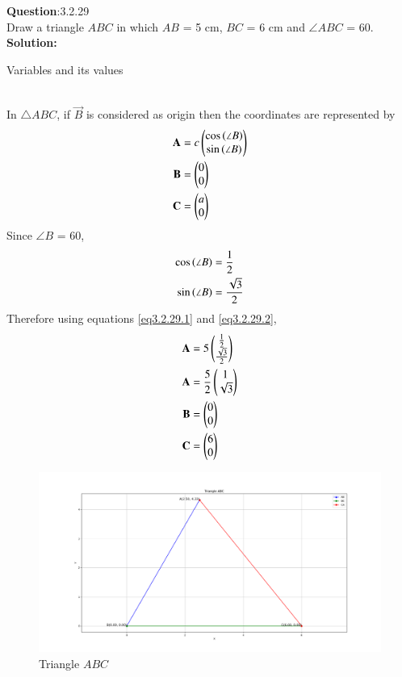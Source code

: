 \documentclass[journal]{IEEEtran}
\begin{document}
\textbf{Question}:3.2.29\\
Draw a triangle $ABC$ in which $AB$ = 5 cm, $BC$ = 6 cm and $\angle ABC$ = 60\degree.
\\
\textbf{Solution:}
\renewcommand{\tablename}{Table 3.2.29.1}
\begin{table}[h!]
  \centering
  
  \caption{Variables and its values}
\end{table}
\\
In $\triangle ABC$, if $\vec{B}$ is considered as origin then the coordinates are represented by
 \begin{align}
 \mathbf{A} & = c\begin{pmatrix}\cos{\ensuremath{\left(\angle B\right)}} \\ \sin{\ensuremath{\left(\angle B\right)}}\end{pmatrix} \label{eq3.2.29.1} \\
 \mathbf{B} & = \begin{pmatrix}0 \\ 0\end{pmatrix} \\
 \mathbf{C} & = \begin{pmatrix}a \\ 0\end{pmatrix} \label{eq3.2.29.2}
 \end{align}
 Since $\angle B$ = 60\degree,
 \begin{align}
     \cos{\ensuremath{\left(\angle B\right)}} & = \frac{1}{2} \\
    \sin{\ensuremath{\left(\angle B\right)}} & = \frac{\sqrt{3}}{2}
 \end{align}
Therefore using equations \ref{eq3.2.29.1} and \ref{eq3.2.29.2},
\begin{align}
\mathbf{A} & = 5\begin{pmatrix}\frac{1}{2} \\ \frac{\sqrt{3}}{2}\end{pmatrix} \\
\mathbf{A} & = \frac{5}{2}\begin{pmatrix}1 \\ \sqrt{3}\end{pmatrix} \\
\mathbf{B} & = \begin{pmatrix}0 \\ 0\end{pmatrix} \\
\mathbf{C} & = \begin{pmatrix}6 \\ 0\end{pmatrix}
\end{align}
\begin{figure}[h!]
   \centering
   \includegraphics[width=0.7\linewidth]{figs/triangle.png}
	\caption{Triangle $ABC$}
   \end{figure}
\end{document}

